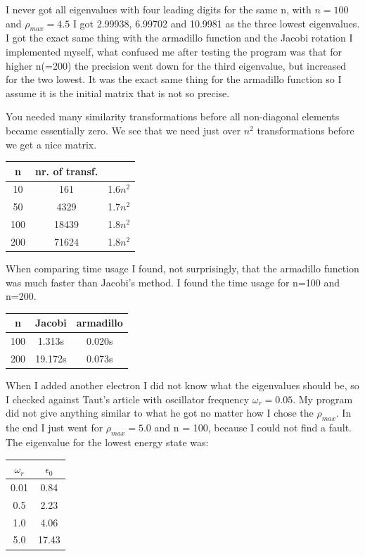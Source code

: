 \documentclass[a4wide,12pt]{article}
\begin{document}
I never got all eigenvalues with four leading digits for the same n, with $n = 100$ and $\rho_{max} = 4.5$ I got 2.99938, 6.99702 and 10.9981 as the three lowest eigenvalues. 
I got the exact same thing with the armadillo function and the Jacobi rotation I implemented myself, what confused me after testing the program was that for higher n(=200) the precision went down for the third eigenvalue, but increased for the two lowest. 
It was the exact same thing for the armadillo function so I assume it is the initial matrix that is not so precise.

You needed many similarity transformations before all non-diagonal elements became essentially zero. We see that we need just over $n^2$ transformations 
before we get a nice matrix. 

\begin{tabular}{|c|c|c|}
\hline
	n & nr. of transf. &  \\ \hline
	10 & 161 & 1.6$n^2$ \\ \hline
	50 & 4329 & 1.7$n^2$ \\ \hline
	100 & 18439 & 1.8$n^2$ \\ \hline
	200 & 71624 & 1.8$n^2$ \\ \hline
\end{tabular}

When comparing time usage I found, not surprisingly, that the armadillo function was much faster than Jacobi's method. I found the time usage for n=100 and n=200.

\begin{tabular}{|c|c|c|}
\hline
	n & Jacobi & armadillo \\ \hline
	100 & 1.313s & 0.020s \\ \hline
	200 & 19.172s & 0.073s \\ \hline
\end{tabular}

When I added another electron I did not know what the eigenvalues should be, so I checked against Taut's article with oscillator frequency $\omega_r = 0.05$. My program did not give anything similar to what he got
no matter how I chose the $\rho_{max}$. In the end I just went for $\rho_{max} = 5.0$ and n = 100, because I could not find a fault. 
The eigenvalue for the lowest energy state was:

\begin{tabular}{|c|c|}
\hline
	$\omega_r$ & $\epsilon_0$ \\ \hline
	0.01 & 0.84 \\ \hline
	0.5 & 2.23 \\ \hline
	1.0 & 4.06 \\ \hline
	5.0 & 17.43 \\ \hline
\end{tabular}
\end{document}
